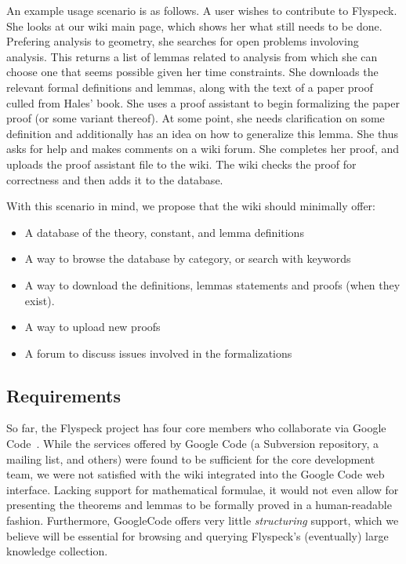An example usage scenario is as follows.  A user
wishes to contribute to Flyspeck.  She looks at our wiki main page,
which shows her what still needs to be done.  Prefering analysis to
geometry, she searches for open problems involoving analysis.  This
returns a list of lemmas related to analysis from which she can
choose one that seems possible given her time constraints. She
downloads the relevant formal definitions and lemmas, along with the
text of a paper proof culled from Hales' book.  She uses a proof
assistant to begin formalizing the paper proof (or some variant
thereof).  At some point, she needs clarification on some definition and additionally
has an idea on how to generalize this lemma.  She thus asks for help
and makes comments on a wiki forum.  She completes her proof, and
uploads the proof assistant file to the wiki.  The wiki checks the proof
for correctness and then adds it to the database.

With this scenario in mind, we propose that the wiki should minimally offer: 

\begin{itemize} 
\item A database of the theory, constant, and lemma definitions 
\item A way to browse the database by category, or search with keywords 
\item A way to download the definitions, lemmas statements and proofs (when they exist). 
\item A way to upload new proofs 
\item A forum to discuss issues involved in the formalizations 
\end{itemize} 

\subsection{Requirements}

So far, the Flyspeck project has four core members who collaborate via
Google Code~\cite{website:GoogleCode}.  While the services offered by
Google Code (a Subversion repository, a mailing list, and others) were
found to be sufficient for the core development team, we were not
satisfied with the wiki integrated into the Google Code web interface.
Lacking support for mathematical formulae, it would not even allow for
presenting the theorems and lemmas to be formally proved in a
human-readable fashion.  Furthermore, GoogleCode offers very
little \emph{structuring} support, which we believe will be
essential for browsing and querying Flyspeck's 
(eventually) large knowledge collection.

